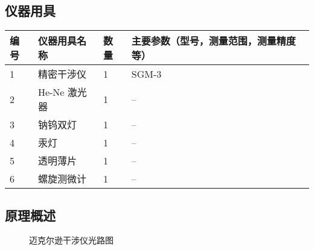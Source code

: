 \documentclass[dvipsnames, svgnames,a4paper,11pt]{article}
\begin{document}
	\subsection{仪器用具}
	\begin{table}[htbp]
		\centering
		\renewcommand\arraystretch{1.6}
		\begin{tabular}{p{}|p{}|p{}|p{}}
			\hline
			编号& 仪器用具名称 & 数量 &  主要参数（型号，测量范围，测量精度等） \\
			\hline
			1& 精密干涉仪 & 1 & SGM-3 \\
			\hline
			2& He-Ne 激光器 & 1 & -- \\
			\hline
			3& 钠钨双灯 & 1 & -- \\
			\hline
			4& 汞灯 & 1 & -- \\
			\hline
			5& 透明薄片 & 1 & -- \\
			\hline
			6& 螺旋测微计 & 1 & -- \\
			\hline
		\end{tabular}
	\end{table}
	
	\subsection{原理概述}
	
	\begin{figure}[htbp]
		\centering
		\caption{迈克尔逊干涉仪光路图}
		\label{fig:figCB1}			
	\end{figure}
	
\end{document}
